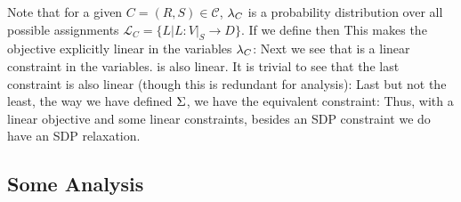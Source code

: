 Note that for a given $C =(R, S) \in \mathcal{C}$, $\lambda_C$ is a probability distribution over all possible assignments $\mathcal{L}_C = \{L | L: V|_S \rightarrow D\}$. 
If we define 
then 
This makes the objective explicitly linear in the variables $\lambda_C$:
Next we see that 
is a linear constraint in the variables. 
is also linear.
It is trivial to see that the last constraint is also linear (though this is redundant for analysis):
Last but not the least, the way we have defined $\Sigma$, we have the equivalent constraint:
Thus, with a linear objective and some linear constraints, besides an SDP constraint we do have an SDP relaxation.


\subsection{Some Analysis}

